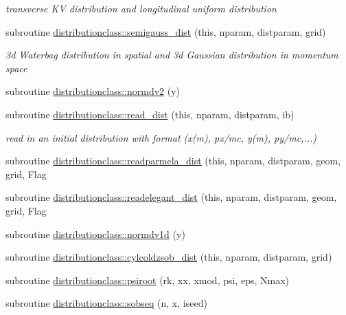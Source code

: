 \begin{DoxyCompactItemize}
\begin{DoxyCompactList}\small\item\em transverse KV distribution and longitudinal uniform distribution \end{DoxyCompactList}\item 
subroutine \mbox{\hyperlink{namespacedistributionclass_a5ae8e13c52291510b7b0b6fe333db73f}{distributionclass\+::semigauss\+\_\+dist}} (this, nparam, distparam, grid)
\begin{DoxyCompactList}\small\item\em 3d Waterbag distribution in spatial and 3d Gaussian distribution in momentum space \end{DoxyCompactList}\item 
subroutine \mbox{\hyperlink{namespacedistributionclass_a020961b4717af242fc3c82090a17ce12}{distributionclass\+::normdv2}} (y)
\item 
subroutine \mbox{\hyperlink{namespacedistributionclass_adfcb2065e951ea9aa42c588f881e6021}{distributionclass\+::read\+\_\+dist}} (this, nparam, distparam, ib)
\begin{DoxyCompactList}\small\item\em read in an initial distribution with format (x(m), px/mc, y(m), py/mc,...) \end{DoxyCompactList}\item 
subroutine \mbox{\hyperlink{namespacedistributionclass_aed89b043090c1817fc57baaa9604eb73}{distributionclass\+::readparmela\+\_\+dist}} (this, nparam, distparam, geom, grid, Flag
\item 
subroutine \mbox{\hyperlink{namespacedistributionclass_acf080fd52aac8287d955bcfd88362c07}{distributionclass\+::readelegant\+\_\+dist}} (this, nparam, distparam, geom, grid, Flag
\item 
subroutine \mbox{\hyperlink{namespacedistributionclass_ac36fd92d83720ca88efee259d51ec474}{distributionclass\+::normdv1d}} (y)
\item 
subroutine \mbox{\hyperlink{namespacedistributionclass_a149c64b379e691ba9bfba3dc16c44571}{distributionclass\+::cylcoldzsob\+\_\+dist}} (this, nparam, distparam, grid)
\item 
subroutine \mbox{\hyperlink{namespacedistributionclass_a714922ece09780473330b901fa566f71}{distributionclass\+::psiroot}} (rk, xx, xmod, psi, eps, Nmax)
\item 
subroutine \mbox{\hyperlink{namespacedistributionclass_a8125c1fdf424cfd4bad6cd74eb2d3946}{distributionclass\+::sobseq}} (n, x, iseed)
\item 

\end{DoxyCompactItemize}
